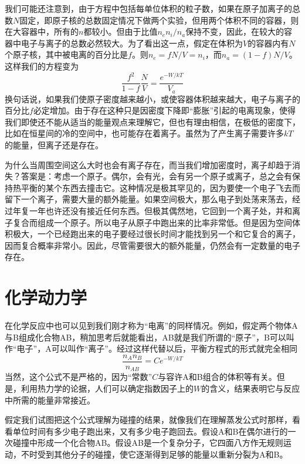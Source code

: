 我们可能还注意到，由于方程中包括每单位体积的粒子数，如果在原子加离子的总数$N$固定，即原子核的总数固定情况下做两个实验，但用两个体积不同的容器，则在大容器中，所有的$n$都较小。但由于比值$n_e n_i /n_a$保持不变，因此，在较大的容器中电子与离子的总数必然较大。为了看出这一点，假定在体积为$V$的容器内有$N$个原子核，其中被电离的百分比是$f$。则$n_e =fN /V =n_i$，而$n_a =(1-f )N /V$。这样我们的方程变为
\begin{equation}
    \label{Eq:I:42:8}
    \frac{f^2}{1-f}\frac{N}{V} = \frac{e^{-W/kT}}{V_a}
\end{equation}
换句话说，如果我们使原子密度越来越小，或使容器体积越来越大，电子与离子的百分比$f$必定增加。由于存在这种只是因密度下降即“膨胀”引起的电离现象，使得我们即使还不能从适当的能量观点来理解它，但也有理由相信，在极低的密度下，比如在恒星间的冷的空间中，也可能存在着离子。虽然为了产生离子需要许多$kT$的能量，但离子还是存在。

为什么当周围空间这么大时也会有离子存在，而当我们增加密度时，离子却趋于消失？答案是：考虑一个原子。偶尔，会有光，会有另一个原子或离子，总之会有保持热平衡的某个东西去撞击它。这种情况是极其罕见的，因为要使一个电子飞去而留下一个离子，需要大量的额外能量。如果空间极大，那么电子到处荡来荡去，经过年复一年也许还没有接近任何东西。但极其偶然地，它回到一个离子处，并和离子复合而组成一个原子。所以电子从原子中跑出来的比率非常低。但是因为空间体积极大，一个已经跑出来的电子要经过很长时间才能找到另一个和它复合的离子，因而复合概率非常小。因此，尽管需要很大的额外能量，仍然会有一定数量的电子存在。

\section{化学动力学}

在化学反应中也可以见到我们刚才称为“电离”的同样情况。例如，假定两个物体A与B组成化合物AB，稍加思考后就能看出，AB就是我们所谓的“原子”，B可以叫作“电子”，A可以叫作“离子”。经过这样代替以后，平衡方程式的形式就完全相同
\begin{equation}
    \label{Eq:I:42:9}
    \frac{n_An_B}{n_{AB}}=Ce^{-W/kT}
\end{equation}
当然，这个公式不是严格的，因为“常数”$C$与容许A和B组合的体积等有关。但是，利用热力学的论据，人们可以确定指数因子上的$W$的含义，结果表明它与反应中所需的能量非常接近。

假定我们试图把这个公式理解为碰撞的结果，就像我们在理解蒸发公式时那样，看看单位时间有多少电子跑出来，又有多少电子跑回去。假设A和B在偶尔进行的一次碰撞中形成一个化合物AB。假设AB是一个复杂分子，它四面八方作无规则运动，不时受到其他分子的碰撞，使它逐渐得到足够的能量以重新分裂为A和B。

